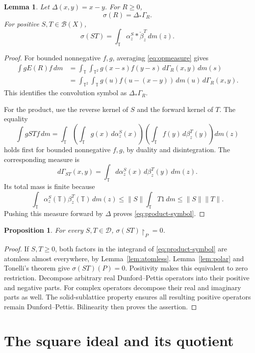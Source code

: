 \documentclass[11pt,reqno]{amsart}
\newtheorem{proposition}[theorem]{Proposition}
\newtheorem{lemma}[theorem]{Lemma}
\theoremstyle{definition}
\theoremstyle{remark}
\newcommand{\T}{\mathbb T}
\newcommand{\B}{\mathcal B}
\newcommand{\D}{\mathcal D}
\newcommand{\restr}[2]{#1\!\upharpoonright_{#2}}
\begin{document}
\begin{lemma}\label{lem:symbol}
Let $\Delta(x,y)=x-y$. For $R\geq0$,
\[
 \sigma(R)=\Delta_*\Gamma_R.
\]
For positive $S,T\in\B(X)$,
\begin{equation}\label{eq:product-symbol}
 \sigma(ST)=\int_\T\alpha_z^S*\check\beta_z^T\,dm(z).
\end{equation}
\end{lemma}
\begin{proof}
For bounded nonnegative $f,g$, averaging \eqref{eq:opmeasure} gives
\begin{align*}
 \int gE(R)f\,dm
 &=\int_\T\int_{\T^2}g(x-s)f(y-s)\,d\Gamma_R(x,y)\,dm(s)\\
 &=\int_{\T^2}\int_\T g(u)f(u-(x-y))\,dm(u)\,d\Gamma_R(x,y).
\end{align*}
This identifies the convolution symbol as $\Delta_*\Gamma_R$.

For the product, use the reverse kernel of $S$ and the forward kernel of $T$. The equality
\[
 \int gSTf\,dm
 =\int_\T\left(\int_\T g(x)\,d\alpha_z^S(x)\right)
             \left(\int_\T f(y)\,d\beta_z^T(y)\right)dm(z)
\]
holds first for bounded nonnegative $f,g$, by duality and disintegration. The corresponding measure is
\[
 d\Gamma_{ST}(x,y)=\int_\T d\alpha_z^S(x)\,d\beta_z^T(y)\,dm(z).
\]
Its total mass is finite because
\[
 \int_\T\alpha_z^S(\T)\beta_z^T(\T)\,dm(z)
 \leq\|S\|\int_\T T1\,dm\leq\|S\|\|T\|.
\]
Pushing this measure forward by $\Delta$ proves \eqref{eq:product-symbol}.
\end{proof}

\begin{proposition}\label{prop:annihilation}
For every $S,T\in\D$, $\restr{\sigma(ST)}{P}=0$.
\end{proposition}
\begin{proof}
If $S,T\geq0$, both factors in the integrand of \eqref{eq:product-symbol} are atomless almost everywhere, by Lemma~\ref{lem:atomless}. Lemma~\ref{lem:polar} and Tonelli's theorem give $\sigma(ST)(P)=0$. Positivity makes this equivalent to zero restriction. Decompose arbitrary real Dunford--Pettis operators into their positive and negative parts. For complex operators decompose their real and imaginary parts as well. The solid-sublattice property ensures all resulting positive operators remain Dunford--Pettis. Bilinearity then proves the assertion.
\end{proof}

\section{The square ideal and its quotient}\label{sec:square}
\end{document}
